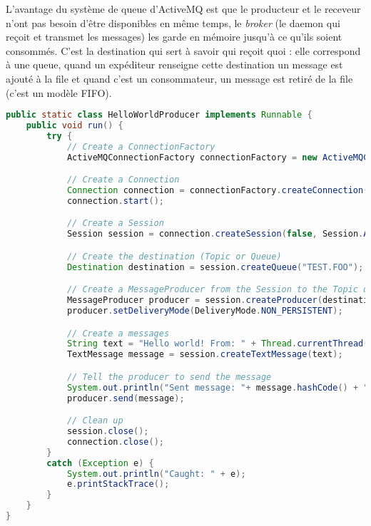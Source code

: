 L'avantage du système de queue d'ActiveMQ est que le producteur et le receveur n'ont pas besoin d'être disponibles en même temps, le \textit{broker} (le daemon qui reçoit et  transmet les messages) les garde en mémoire jusqu'à ce qu'ils soient consommés. C'est la destination qui sert à savoir qui reçoit quoi : elle correspond à une queue, quand un expéditeur renseigne cette destination un message est ajouté à la file et quand c'est un consommateur, un message est retiré de la file (c'est un modèle FIFO).

\begin{minipage}{\linewidth}
	\begin{lstlisting}[language=Java, caption="Un exemple écourté d'échange de messages \textit{via} ActiveMQ", label={lst:activemq_ex}]
  public static class HelloWorldProducer implements Runnable {
    public void run() {
        try {
            // Create a ConnectionFactory
            ActiveMQConnectionFactory connectionFactory = new ActiveMQConnectionFactory("vm://localhost");

            // Create a Connection
            Connection connection = connectionFactory.createConnection();
            connection.start();

            // Create a Session
            Session session = connection.createSession(false, Session.AUTO_ACKNOWLEDGE);

            // Create the destination (Topic or Queue)
            Destination destination = session.createQueue("TEST.FOO");

            // Create a MessageProducer from the Session to the Topic or Queue
            MessageProducer producer = session.createProducer(destination);
            producer.setDeliveryMode(DeliveryMode.NON_PERSISTENT);

            // Create a messages
            String text = "Hello world! From: " + Thread.currentThread().getName() + " : " + this.hashCode();
            TextMessage message = session.createTextMessage(text);

            // Tell the producer to send the message
            System.out.println("Sent message: "+ message.hashCode() + " : " + Thread.currentThread().getName());
            producer.send(message);

            // Clean up
            session.close();
            connection.close();
        }
        catch (Exception e) {
            System.out.println("Caught: " + e);
            e.printStackTrace();
        }
    }
}


\end{lstlisting}
\end{minipage}
